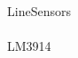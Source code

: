 \documentclass[10pt,a4paper,final]{article}
\begin{document}
\begin{spacing}{1.5}
\begin{multicols}{3}
LineSensors\\
\\
LM3914\\

\end{multicols}
\end{spacing}
\end{document}
